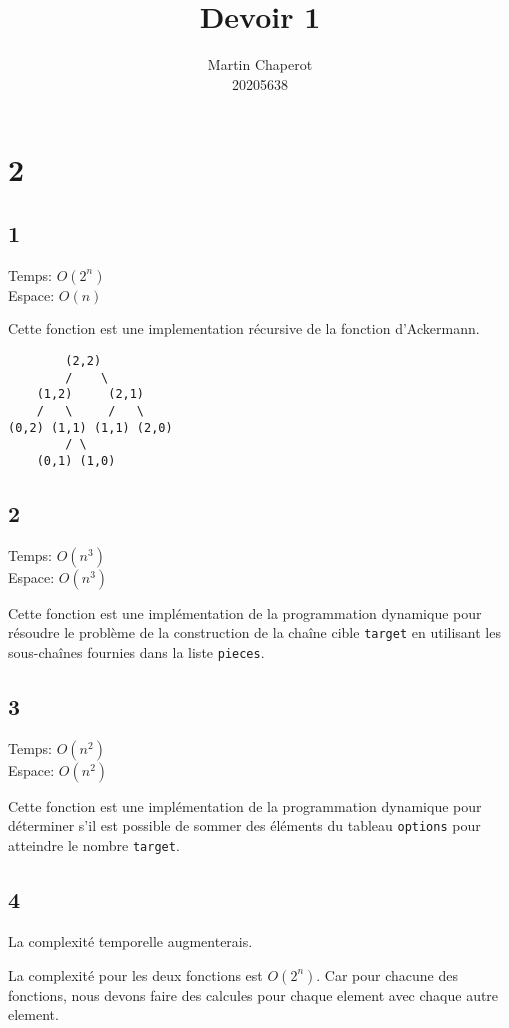 \documentclass[12pt]{article}
\title{Devoir 1}
\author{Martin Chaperot\\20205638}
\date{}
\begin{document}
\maketitle

\section*{2}
\subsection*{1}
Temps: \(O(2^n)\)\\
Espace: \(O(n)\)

Cette fonction est une implementation récursive de la fonction d'Ackermann.

\begin{verbatim}
        (2,2)
        /    \
    (1,2)     (2,1)
    /   \     /   \
(0,2) (1,1) (1,1) (2,0)
        / \
    (0,1) (1,0)
\end{verbatim}

\subsection*{2}
Temps: \(O(n^3)\)\\
Espace: \(O(n^3)\)

Cette fonction est une implémentation de la programmation dynamique
pour résoudre le problème de la construction de la chaîne cible \verb|target| en
utilisant les sous-chaînes fournies dans la liste \verb|pieces|.

\subsection*{3}
Temps: \(O(n^2)\)\\
Espace: \(O(n^2)\)

Cette fonction est une implémentation de la programmation dynamique pour
déterminer s'il est possible de sommer des éléments du tableau \verb|options|
pour atteindre le nombre \verb|target|.

\subsection*{4}
La complexité temporelle augmenterais.

La complexité pour les deux fonctions est \(O(2^n)\). Car pour chacune des fonctions,
nous devons faire des calcules pour chaque element avec chaque autre element.
\end{document}
